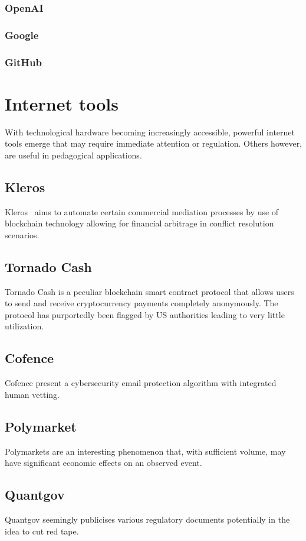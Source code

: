 \documentclass[11pt]{article}
\begin{document}
\subsubsection{OpenAI}
\subsubsection{Google}
\subsubsection{GitHub}

\section{Internet tools}
With technological hardware becoming increasingly accessible, powerful internet tools emerge that may require immediate attention or regulation. Others however, are useful in pedagogical applications.
\subsection{Kleros~\cite{zhuk_2023_applying}}
Kleros~\cite{zhuk_2023_applying} aims to automate certain commercial mediation processes by use of blockchain technology allowing for financial arbitrage in conflict resolution scenarios.
\subsection{Tornado Cash~\cite{nadler_2023_tornado}~\cite{pertsev_2019_tornado}}
Tornado Cash is a peculiar blockchain smart contract protocol that allows users to send and receive cryptocurrency payments completely anonymously. The protocol has purportedly been flagged by US authorities leading to very little utilization.
\subsection{Cofence~\cite{cofense_2024_phishme}}
Cofence present a cybersecurity email protection algorithm with integrated human vetting.
\subsection{Polymarket~\cite{polymarket}}
Polymarkets are an interesting phenomenon that, with sufficient volume, may have significant economic effects on an observed event.
\subsection{Quantgov~\cite{quantgovhome_2025_quantgov}}
Quantgov seemingly publicises various regulatory documents potentially in the idea to cut red tape.
\end{document}
